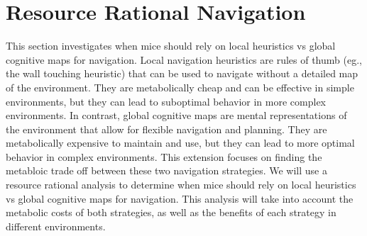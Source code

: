 \section{Resource Rational Navigation}

This section investigates when mice should rely on local heuristics vs global cognitive maps for navigation. Local navigation heuristics are rules of thumb (eg., the wall touching heuristic) that can be used to navigate without a detailed map of the environment. They are metabolically cheap and can be effective in simple environments, but they can lead to suboptimal behavior in more complex environments. In contrast, global cognitive maps are mental representations of the environment that allow for flexible navigation and planning. They are metabolically expensive to maintain and use, but they can lead to more optimal behavior in complex environments.
This extension focuses on finding the metabloic trade off between these two navigation strategies. We will use a resource rational analysis to determine when mice should rely on local heuristics vs global cognitive maps for navigation. This analysis will take into account the metabolic costs of both strategies, as well as the benefits of each strategy in different environments.
